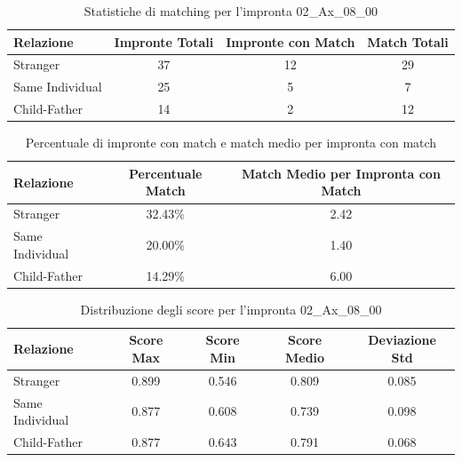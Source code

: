 \begin{table}[htbp]
\centering
\caption{Statistiche di matching per l'impronta 02\_Ax\_08\_00}
\label{tab:results_02_Ax_08_00}
\begin{tabular}{|l|c|c|c|}
\hline
\textbf{Relazione} & \textbf{Impronte Totali} & \textbf{Impronte con Match} & \textbf{Match Totali} \\
\hline
Stranger & 37 & 12 & 29 \\
\hline
Same Individual & 25 & 5 & 7 \\
\hline
Child-Father & 14 & 2 & 12 \\
\hline
\end{tabular}
\end{table}


\begin{table}[htbp]
\centering
\caption{Percentuale di impronte con match e match medio per impronta con match}
\label{tab:match_percentage_02_Ax_08_00}
\begin{tabular}{|l|c|c|}
\hline
\textbf{Relazione} & \textbf{Percentuale Match} & \textbf{Match Medio per Impronta con Match} \\
\hline
Stranger & 32.43\% & 2.42 \\
\hline
Same Individual & 20.00\% & 1.40 \\
\hline
Child-Father & 14.29\% & 6.00 \\
\hline
\end{tabular}
\end{table}


\begin{table}[htbp]
\centering
\caption{Distribuzione degli score per l'impronta 02\_Ax\_08\_00}
\label{tab:scores_02_Ax_08_00}
\begin{tabular}{|l|c|c|c|c|}
\hline
\textbf{Relazione} & \textbf{Score Max} & \textbf{Score Min} & \textbf{Score Medio} & \textbf{Deviazione Std} \\
\hline
Stranger & 0.899 & 0.546 & 0.809 & 0.085 \\
\hline
Same Individual & 0.877 & 0.608 & 0.739 & 0.098 \\
\hline
Child-Father & 0.877 & 0.643 & 0.791 & 0.068 \\
\hline
\end{tabular}
\end{table}


